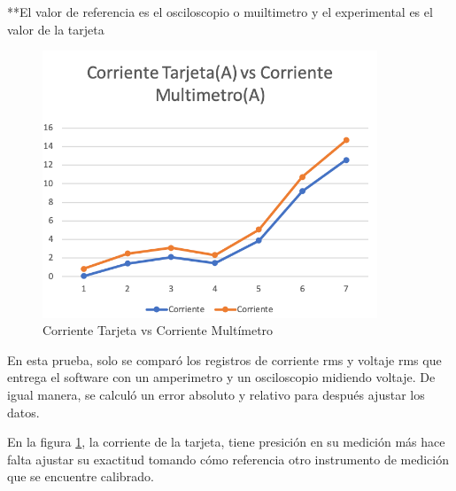   **El valor de referencia es el osciloscopio o muiltimetro y el experimental es el valor de la tarjeta\\

  \begin{figure}[H]
    \begin{center}
        \includegraphics[width = 10cm]{4Resultados/prueba-1.png}
        \caption{ Corriente Tarjeta vs Corriente Multímetro } 
        \label{fig:prueba1}
   \end{center}
\end{figure}

En esta prueba, solo se comparó los registros de corriente rms y voltaje rms que entrega el software con un amperimetro y un osciloscopio midiendo voltaje.
 De igual manera, se calculó un error absoluto y relativo para después ajustar los datos.

 En la figura \ref{fig:prueba1}, la corriente de la tarjeta, tiene presición en su medición más hace falta ajustar su exactitud tomando cómo referencia otro instrumento de medición que se encuentre calibrado.

